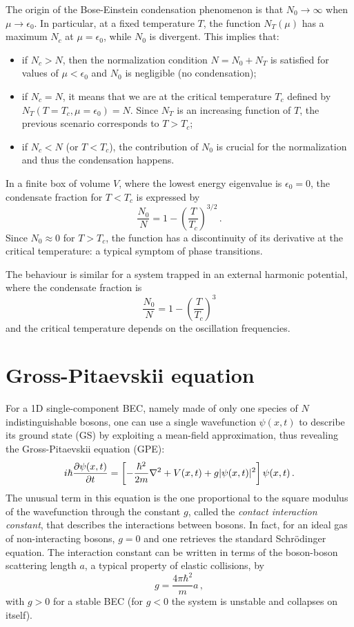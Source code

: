 The origin of the Bose-Einstein condensation phenomenon is that $N_0 \to \infty$ when $\mu \to \epsilon_0$. In particular, at a fixed temperature $T$, the function $N_T(\mu)$ has a maximum $N_c$ at $\mu = \epsilon_0$, while $N_0$ is divergent. This implies that:
\begin{itemize}
    \item if $N_c > N$, then the normalization condition $N = N_0 + N_T$ is satisfied for values of $\mu < \epsilon_0$ and $N_0$ is negligible (no condensation);
    \item if $N_c = N$, it means that we are at the critical temperature $T_c$ defined by $N_T(T = T_c, \mu = \epsilon_0) = N$. Since $N_T$ is an increasing function of $T$, the previous scenario corresponds to $T > T_c$;
    \item if $N_c < N$ (or $T < T_c$), the contribution of $N_0$ is crucial for the normalization and thus the condensation happens.
\end{itemize}
In a finite box of volume $V$, where the lowest energy eigenvalue is $\epsilon_0 = 0$, the condensate fraction for $T < T_c$ is expressed by
\begin{equation*}
    \frac{N_0}{N} = 1-\left(\frac{T}{T_c}\right)^{3/2}\, .
\end{equation*}
Since $N_0 \approx 0$ for $T > T_c$, the function has a discontinuity of its derivative at the critical temperature: a typical symptom of phase transitions.

The behaviour is similar for a system trapped in an external harmonic potential, where the condensate fraction is
\begin{equation*}
    \frac{N_0}{N} = 1-\left(\frac{T}{T_c}\right)^3
\end{equation*}
and the critical temperature depends on the oscillation frequencies.

\section{Gross-Pitaevskii equation}
For a 1D single-component BEC, namely made of only one species of $N$ indistinguishable bosons, one can use a single wavefunction $\psi(x,t)$ to describe its ground state (GS) by exploiting a mean-field approximation, thus revealing the Gross-Pitaevskii equation (GPE):
\begin{equation}
    i\hbar \pdv{\psi(x,t)}{t} = \left[ 
        -\frac{\hbar^2}{2m}\nabla^2 + V(x,t) + g|\psi(x,t)|^2
    \right] \psi(x,t)\, .
\end{equation}
The unusual term in this equation is the one proportional to the square modulus of the wavefunction through the constant $g$, called the \textit{contact interaction constant}, that describes the interactions between bosons. In fact, for an ideal gas of non-interacting bosons, $g = 0$ and one retrieves the standard Schrödinger equation. The interaction constant can be written in terms of the boson-boson scattering length $a$, a typical property of elastic collisions, by
\[
    g = \frac{4\pi\hbar^2}{m}a\, ,
\]
with $g > 0$ for a stable BEC (for $g < 0$ the system is unstable and collapses on itself).

